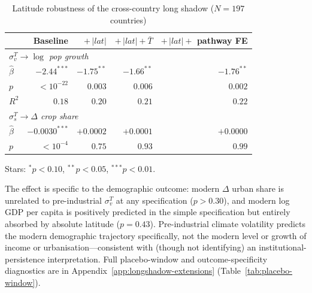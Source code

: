 \documentclass[11pt,letterpaper]{article}
\begin{document}
\begin{table}[H]
\centering
\caption{Latitude robustness of the cross-country long shadow ($N=197$ countries)}
\label{tab:lat-robust}
\small
\begin{tabular}{lrrrr}
\toprule
& Baseline & $+\,|lat|$ & $+\,|lat|+\bar T$ & $+\,|lat|+$ pathway FE \\
\midrule
\multicolumn{5}{l}{\textit{$\sigma_v^T \to \log$ pop growth}}\\
$\hat\beta$              & $-2.44^{***}$ & $-1.75^{**}$ & $-1.66^{**}$ & $-1.76^{**}$ \\
$p$                      & $<10^{-22}$   & $0.003$      & $0.006$      & $0.002$       \\
$R^2$                    & $0.18$        & $0.20$       & $0.21$       & $0.22$        \\
\midrule
\multicolumn{5}{l}{\textit{$\sigma_s^T \to \Delta$ crop share}}\\
$\hat\beta$              & $-0.0030^{***}$ & $+0.0002$   & $+0.0001$   & $+0.0000$ \\
$p$                      & $<10^{-4}$      & $0.75$      & $0.93$      & $0.99$    \\
\bottomrule
\end{tabular}
\par\smallskip\footnotesize{Stars: $^{*}p<0.10$, $^{**}p<0.05$, $^{***}p<0.01$.}
\end{table}

The effect is specific to the demographic outcome: modern $\Delta$ urban share is unrelated to pre-industrial $\sigma_v^T$ at any specification ($p>0.30$), and modern log GDP per capita is positively predicted in the simple specification but entirely absorbed by absolute latitude ($p = 0.43$). Pre-industrial climate volatility predicts the modern demographic trajectory specifically, not the modern level or growth of income or urbanisation---consistent with (though not identifying) an institutional-persistence interpretation. Full placebo-window and outcome-specificity diagnostics are in Appendix~\ref{app:longshadow-extensions} (Table~\ref{tab:placebo-window}).
\end{document}
